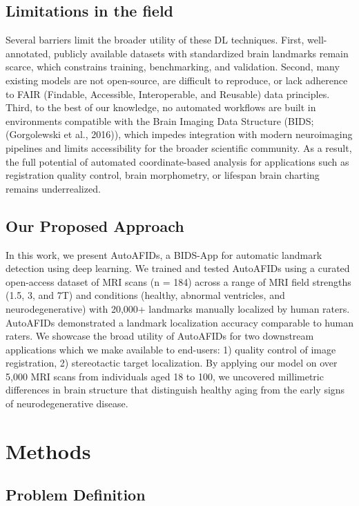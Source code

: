 \subsection{Limitations in the field}
Several barriers limit the broader utility of these DL techniques. First, well-annotated, publicly available datasets with standardized brain landmarks remain scarce, which constrains training, benchmarking, and validation. Second, many existing models are not open-source, are difficult to reproduce, or lack adherence to FAIR (Findable, Accessible, Interoperable, and Reusable) data principles. Third, to the best of our knowledge, no automated workflows are built in environments compatible with the Brain Imaging Data Structure (BIDS; (Gorgolewski et al., 2016)), which impedes integration with modern neuroimaging pipelines and limits accessibility for the broader scientific community. As a result, the full potential of automated coordinate-based analysis for applications such as registration quality control, brain morphometry, or lifespan brain charting remains underrealized.

\subsection{Our Proposed Approach}
In this work, we present AutoAFIDs, a BIDS-App for automatic landmark detection using deep learning. We trained and tested AutoAFIDs using a curated open-access dataset of MRI scans (n = 184) across a range of MRI field strengths (1.5, 3, and 7T) and conditions (healthy, abnormal ventricles, and neurodegenerative) with 20,000+ landmarks manually localized by human raters. AutoAFIDs demonstrated a landmark localization accuracy comparable to human raters. We showcase the broad utility of AutoAFIDs for two downstream applications which we make available to end-users: 1) quality control of image registration, 2) stereotactic target localization. By applying our model on over 5,000 MRI scans from individuals aged 18 to 100, we uncovered millimetric differences in brain structure that distinguish healthy aging from the early signs of neurodegenerative disease.

\section{Methods}
\subsection{Problem Definition}

